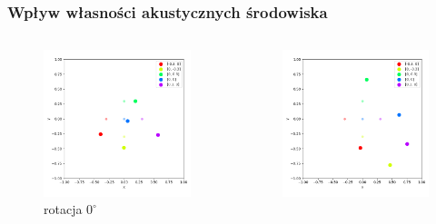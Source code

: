 \begin{frame}{}
    \frametitle{Wpływ własności akustycznych środowiska}
    \begin{columns}
        \begin{column}{0.5\textwidth}
            \begin{figure}
                \centering
                \includegraphics[width=\textwidth]{../pics/mult_lat_2d_angle/positions_0_mean.png}
                \caption{rotacja $0^{\circ}$}
            \end{figure}
        \end{column}
        \begin{column}{0.5\textwidth}
            \begin{figure}
                \centering
                \includegraphics[width=\textwidth]{../pics/mult_lat_2d_angle/positions_45_mean.png}

\end{figure}
\end{column}
\end{columns}
\end{frame}
